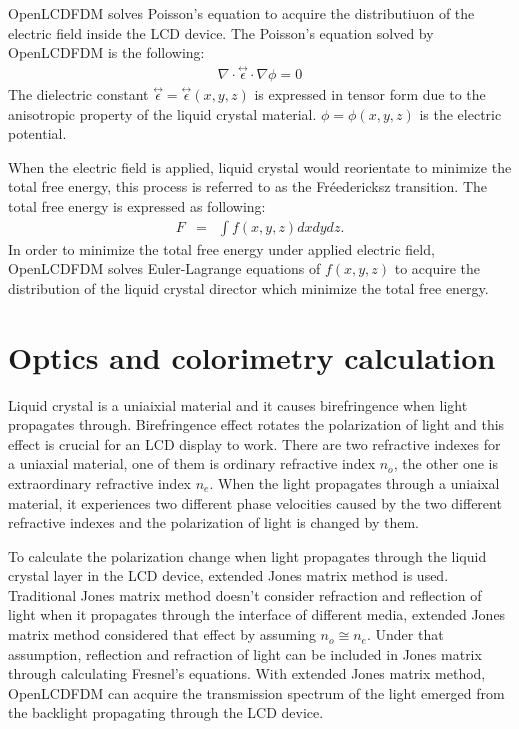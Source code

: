 \documentclass[11pt, a4paper]{article} %
\begin{document}
\begin{multicols}{2}
OpenLCDFDM solves Poisson's equation to acquire the distributiuon of the electric field inside the LCD device. The Poisson's equation solved by OpenLCDFDM is the following: 
\begin{eqnarray}
\nabla\cdot\stackrel{\leftrightarrow}{\epsilon}\cdot\nabla\phi = 0
\label{eq:Poisson_anisotropiv}
\end{eqnarray}
The dielectric constant $\stackrel{\leftrightarrow}{\epsilon} = \stackrel{\leftrightarrow}{\epsilon}(x,y,z)$ is expressed in tensor form due to the anisotropic property of the liquid crystal material. $\phi=\phi(x,y,z)$ is the electric potential.

When the electric field is applied, liquid crystal would reorientate to minimize the total free energy, this process is referred to as the Fréedericksz transition.
The total free energy is expressed as following:
\begin{eqnarray}
F&=&\int f(x,y,z) dxdydz.
\label{eq:total_free_energy}
\end{eqnarray}
In order to minimize the total free energy under applied electric field, OpenLCDFDM solves Euler-Lagrange equations of $f(x,y,z)$ to acquire the distribution of the liquid crystal director which minimize the total free energy.

\section{Optics and colorimetry calculation}
Liquid crystal is a uniaixial material and it causes birefringence when light propagates through. Birefringence effect rotates the polarization of light and this effect is crucial for an LCD display to work. There are two refractive indexes for a uniaxial material, one of them is ordinary refractive index $n_o$, the other one is extraordinary refractive index $n_e$. When the light propagates through a uniaixal material, it experiences two different phase velocities caused by the two different refractive indexes and the polarization of light is changed by them.

To calculate the polarization change when light propagates through the liquid crystal layer in the LCD device, extended Jones matrix method\cite{POCHIYEH} is used.
Traditional Jones matrix method doesn't consider refraction and reflection of light when it propagates through the interface of different media, extended Jones matrix method considered that effect by assuming $n_o \cong n_e$. Under that assumption, reflection and refraction of light can be included in Jones matrix through calculating Fresnel's equations. With extended Jones matrix method, OpenLCDFDM can acquire the transmission spectrum of the light emerged from the backlight propagating through the LCD device.


\end{multicols}
\end{document}
